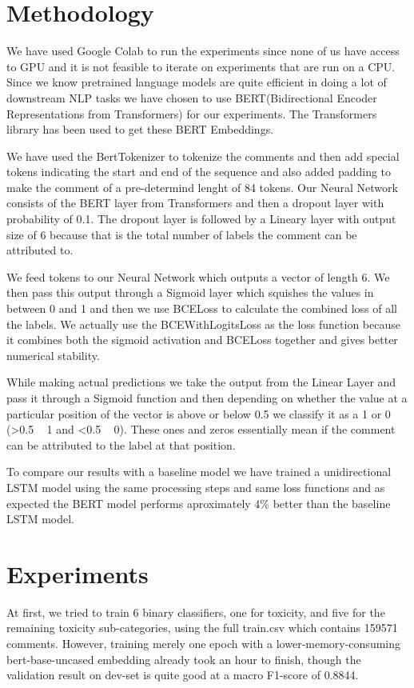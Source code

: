 \documentclass[sigconf]{acmart}
\begin{document}
\section{Methodology}

We have used Google Colab to run the experiments since none of us have access to GPU and it is not feasible to iterate on experiments that are run on a CPU. Since we know pretrained language models are quite efficient in doing a lot of downstream NLP tasks we have chosen to use BERT(Bidirectional Encoder Representations from Transformers) for our experiments. The Transformers library has been used to get these BERT Embeddings.

We have used the BertTokenizer to tokenize the comments and then add special tokens indicating the start and end of the sequence and also added padding to make the comment of a pre-determind lenght of 84 tokens. Our Neural Network consists of the BERT layer from Transformers and then a dropout layer with probability of 0.1. The dropout layer is followed by a Lineary layer with output size of 6 because that is the total number of labels the comment can be attributed to.

We feed tokens to our Neural Network which outputs a vector of length 6. We then pass this output through a Sigmoid layer which squishes the values in between 0 and 1 and then we use BCELoss to calculate the combined loss of all the labels. We actually use the BCEWithLogitsLoss as the loss function because it combines both the sigmoid activation and BCELoss together and gives better numerical stability.

While making actual predictions we take the output from the Linear Layer and pass it through a Sigmoid function and then depending on whether the value at a particular position of the vector is above or below 0.5 we classify it as a 1 or 0 (>0.5 ~ 1 and <0.5 ~ 0). These ones and zeros essentially mean if the comment can be attributed to the label at that position.

To compare our results with a baseline model we have trained a unidirectional LSTM model using the same processing steps and same loss functions and as expected the BERT model performs aproximately 4\% better than the baseline LSTM model.

\section{Experiments}

At first, we tried to train 6 binary classifiers, one for toxicity, and five for the remaining toxicity sub-categories, using the full train.csv which contains 159571 comments. However, training merely one epoch with a lower-memory-consuming bert-base-uncased embedding already took an hour to finish, though the validation result on dev-set is quite good at a macro F1-score of 0.8844.
\end{document}
